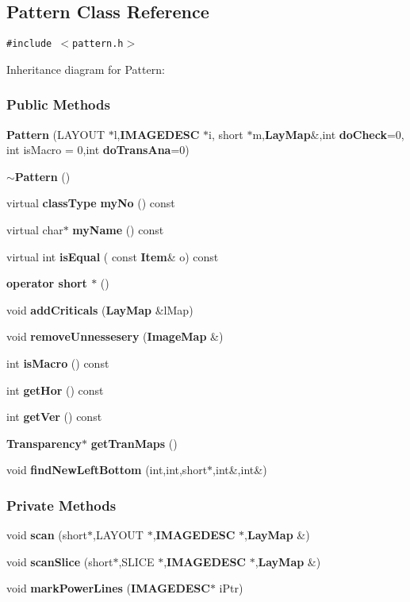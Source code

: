 \subsection{Pattern  Class Reference}
\label{Pattern}
{\tt \#include $<$pattern.h$>$}

Inheritance diagram for Pattern:\begin{figure}[H]
\begin{center}
\leavevmode
\setlength{\epsfysize}{5cm}
\end{center}
\end{figure}
\subsubsection*{Public Methods}
\begin{CompactItemize}
\item 
{\bf Pattern} (LAYOUT $\ast$l,{\bf IMAGEDESC} $\ast$i, short $\ast$m,{\bf Lay\-Map}\&,int {\bf do\-Check}=0, int is\-Macro = 0,int {\bf do\-Trans\-Ana}=0)
\item 
{\bf $\sim$Pattern} ()
\item 
virtual {\bf class\-Type} {\bf my\-No} () const
\item 
virtual char$\ast$ {\bf my\-Name} () const
\item 
virtual int {\bf is\-Equal} ( const {\bf Item}\& o) const
\item 
{\bf operator short $\ast$} ()
\item 
void {\bf add\-Criticals} ({\bf Lay\-Map} \&l\-Map)
\item 
void {\bf remove\-Unnessesery} ({\bf Image\-Map} \&)
\item 
int {\bf is\-Macro} () const
\item 
int {\bf get\-Hor} () const
\item 
int {\bf get\-Ver} () const
\item 
{\bf Transparency}$\ast$ {\bf get\-Tran\-Maps} ()
\item 
void {\bf find\-New\-Left\-Bottom} (int,int,short$\ast$,int\&,int\&)
\end{CompactItemize}
\subsubsection*{Private Methods}
\begin{CompactItemize}
\item 
void {\bf scan} (short$\ast$,LAYOUT $\ast$,{\bf IMAGEDESC} $\ast$,{\bf Lay\-Map} \&)
\item 
void {\bf scan\-Slice} (short$\ast$,SLICE $\ast$,{\bf IMAGEDESC} $\ast$,{\bf Lay\-Map} \&)
\item 
void {\bf mark\-Power\-Lines} ({\bf IMAGEDESC}$\ast$ i\-Ptr)
\end{CompactItemize}
